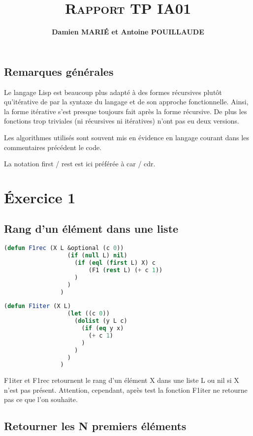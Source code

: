\documentclass[a4paper, 12pt, leqno]{report}
\title{\textsc{\textbf{Rapport TP IA01}}}
\author{\textbf{Damien MARI\'E et Antoine POUILLAUDE}}
\theoremstyle{plain}
\begin{document}
    \maketitle
    \tableofcontents
\newpage
\section*{Remarques générales}
Le langage Lisp est beaucoup plus adapté à des formes récursives plutôt qu'itérative de par la syntaxe du langage et de son approche fonctionnelle.
Ainsi, la forme itérative s’est presque toujours fait après la forme récursive.
De plus les fonctions trop triviales (ni récursives ni itératives) n’ont pas eu deux versions.

Les algorithmes utilisés sont souvent mis en évidence en langage courant dans les commentaires précédent le code.

La notation first / rest est ici préférée à car / cdr.       								
    \chapter{\'Exercice 1}		
        \section{Rang d'un élément dans une liste}        
            \begin{lstlisting}[label=some-code,caption=F1 (X L) version recursive,language=lisp]
                (defun F1rec (X L &optional (c 0))
                  (if (null L) nil)
                    (if (eql (first L) X) c
                        (F1 (rest L) (+ c 1))
                    )
                  )
                )
            \end{lstlisting}
          
            \begin{lstlisting}[label=some-code,caption=F1 (X L) version itérative,language=lisp]
                (defun F1iter (X L)
	              (let ((c 0))
		            (dolist (y L c)
			          (if (eq y x) 
				        (+ c 1)
			          )
		            )
	              )
                )
            \end{lstlisting}
    F1iter et F1rec retournent le rang d'un élément X dans une liste L ou nil si X n’est pas présent. Attention, cependant, après test la fonction F1iter ne retourne pas ce que l'on souhaite.

\newpage
          
		\section{Retourner les N premiers éléments}     
            
\end{document}
